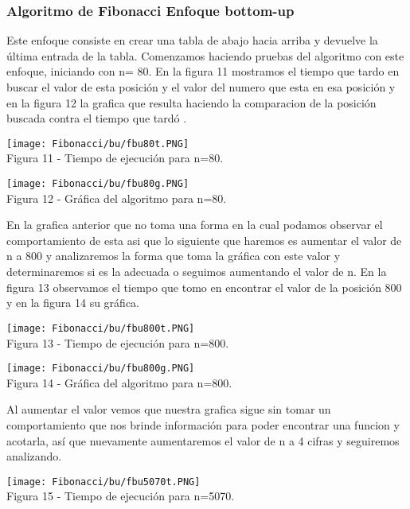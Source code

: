 \documentclass[12pt,twoside]{article}
\begin{document}
\subsubsection{Algoritmo de Fibonacci Enfoque  bottom-up}
Este enfoque consiste en crear una tabla de abajo hacia arriba y devuelve la última entrada de la tabla.
\newline \newline
Comenzamos haciendo pruebas del algoritmo con este enfoque, iniciando con n= 80. En la figura 11 mostramos el tiempo que tardo en buscar el valor de esta posición y el valor del numero que esta en esa posición y en la figura 12 la grafica que resulta haciendo la comparacion de la posición buscada contra el tiempo que tardó .
\begin{center}
    \texttt{[image: Fibonacci/bu/fbu80t.PNG]}\\
    Figura 11 - Tiempo de ejecución para n=80.
\end{center}

\begin{center}
    \texttt{[image: Fibonacci/bu/fbu80g.PNG]}\\
    Figura 12 - Gráfica del algoritmo para n=80.
\end{center}
\newline
En la grafica anterior que no toma una forma en la cual podamos observar el comportamiento de esta asi que lo siguiente que haremos es aumentar el valor de n a 800 y analizaremos la forma que toma la gráfica con este valor y determinaremos si es la adecuada o seguimos aumentando el valor de n.
En la figura 13 observamos el tiempo que tomo en encontrar el valor de la posición 800 y en la figura 14 su gráfica.
\begin{center}
    \texttt{[image: Fibonacci/bu/fbu800t.PNG]}\\
    Figura 13 - Tiempo de ejecución para n=800.
\end{center}

\begin{center}
    \texttt{[image: Fibonacci/bu/fbu800g.PNG]}\\
    Figura 14 - Gráfica del algoritmo para n=800.
\end{center}
\newline
Al aumentar el valor vemos que nuestra grafica sigue sin tomar un comportamiento que nos brinde información para poder encontrar una funcion y acotarla, así que nuevamente aumentaremos el valor de n a 4 cifras y seguiremos analizando.
\begin{center}
    \texttt{[image: Fibonacci/bu/fbu5070t.PNG]}\\
    Figura 15 - Tiempo de ejecución para n=5070.
\end{center}
\end{document}
